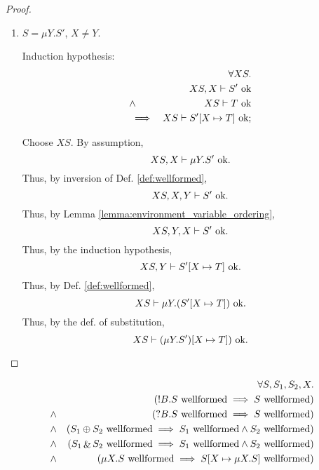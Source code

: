 \documentclass{llncs}
\newcommand*{\send}{\mathord{!}}
\newcommand*{\recv}{\mathord{?}}
\newcommand*{\echoice}{\oplus}
\newcommand*{\ichoice}{\mathop{\&}}
\newcommand*{\wf}[1]{\text{$#1$ {\normalfont \rmfamily wellformed}}}
\newcommand*{\envimpl}       [2]{#1 \vdash #2}
\newcommand*{\envimplok}     [2]{\envimpl{#1}{\text{$#2$ {\normalfont \rmfamily ok}}}}
\renewcommand*{\|}{\;|\;}
\begin{document}
\begin{proof}
\begin{enumerate}
    \item
      \label{case:substitution_wellformedness:mu2}
      $S = \mu Y.S'$, $X \neq Y$.

      Induction hypothesis:
      \begin{eqnarray*}
        &&         \forall XS. \\
        &&         \envimplok{XS, X}{S'} \\
        &\land&    \envimplok{XS}{T} \\
        &\implies& \envimplok{XS}{S'[X \mapsto T]};
      \end{eqnarray*}

      Choose $XS$. By assumption,
      \begin{equation*}
        \envimplok{XS, X}{\mu Y.S'}.
      \end{equation*}
      Thus, by inversion of Def. \ref{def:wellformed},
      \begin{equation*}
        \envimplok{XS, X, Y}{S'}.
      \end{equation*}
      Thus, by Lemma \ref{lemma:environment_variable_ordering},
      \begin{equation*}
        \envimplok{XS, Y, X}{S'}.
      \end{equation*}
      Thus, by the induction hypothesis,
      \begin{equation*}
        \envimplok{XS, Y}{S'[X \mapsto T]}.
      \end{equation*}
      Thus, by Def. \ref{def:wellformed},
      \begin{equation*}
        \envimplok{XS}{\mu Y.(S'[X \mapsto T])}.
      \end{equation*}
      Thus, by the def. of substitution,
      \begin{equation*}
        \envimplok{XS}{(\mu Y.S')[X \mapsto T])}.
      \end{equation*}

  \end{enumerate}
\end{proof}

\begin{lemma}
  \label{lemma:inversion_wellformedness}
  \begin{eqnarray*}
    &&      \forall S, S_1, S_2, X. \\
    &&      (\wf{\send B.S} \implies \wf{S}) \\
    &\land& (\wf{\recv B.S} \implies \wf{S}) \\
    &\land& (\wf{S_1 \echoice S_2} \implies \wf{S_1} \land \wf{S_2}) \\
    &\land& (\wf{S_1 \ichoice S_2} \implies \wf{S_1} \land \wf{S_2}) \\
    &\land& (\wf{\mu X.S} \implies \wf{S[X \mapsto \mu X.S]})
  \end{eqnarray*}
\end{lemma}
\end{document}
